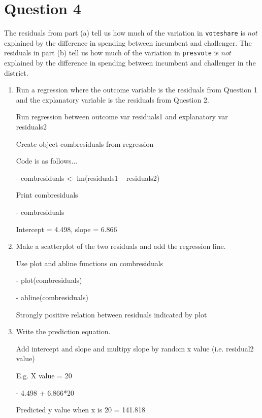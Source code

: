 \documentclass[12pt,letterpaper]{article}
\begin{document}
\section*{Question 4}%
\noindent The residuals from part (a) tell us how much of the variation in \texttt{voteshare} is $not$ explained by the difference in spending between incumbent and challenger. The residuals in part (b) tell us how much of the variation in \texttt{presvote} is $not$ explained by the difference in spending between incumbent and challenger in the district.
	\begin{enumerate}
		\item Run a regression where the outcome variable is the residuals from Question 1 and the explanatory variable is the residuals from Question 2.	\vspace{6cm}
		
		Run regression between outcome var residuals1 and explanatory var residuals2
		
		Create object combresiduals from regression
		
		Code is as follows...
		
	- combresiduals <- lm(residuals1 ~ residuals2)
	
	Print combresiduals
	
	-	combresiduals 
	
	Intercept = 4.498, slope = 6.866
		
		\item Make a scatterplot of the two residuals and add the regression line. 	\vspace{6cm}
		
		Use plot and abline functions on combresiduals
		
	-	plot(combresiduals)
		
	-	abline(combresiduals)
	
	Strongly positive relation between residuals indicated by plot
	
		\item Write the prediction equation.
		
		Add intercept and slope and multipy slope by random x value (i.e. residual2 value)
		
		E.g. X value = 20
		
		- 4.498 + 6.866*20
	
	Predicted y value when x is 20 = 141.818
	
\end{enumerate}
	
	\newpage	
\end{document}
